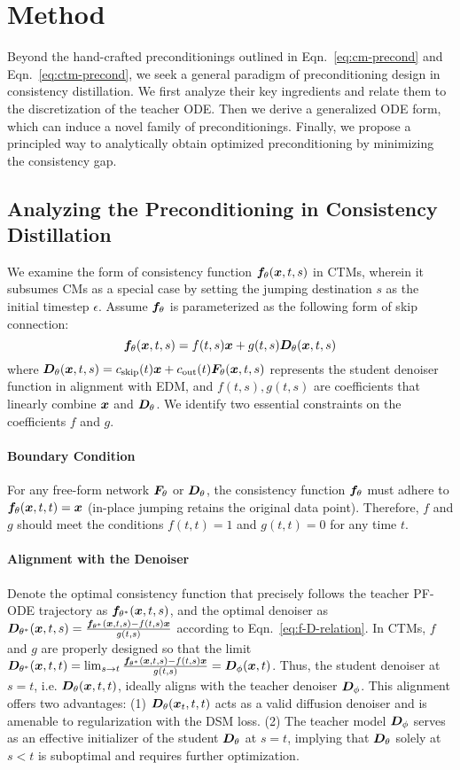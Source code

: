 \section{Method}
Beyond the hand-crafted preconditionings outlined in Eqn.~\eqref{eq:cm-precond} and Eqn.~\eqref{eq:ctm-precond}, we seek a general paradigm of preconditioning design in consistency distillation. We first analyze their key ingredients and relate them to the discretization of the teacher ODE. Then we derive a generalized ODE form, which can induce a novel family of preconditionings. Finally, we propose a principled way to analytically obtain optimized preconditioning by minimizing the consistency gap.
\subsection{Analyzing the Preconditioning in Consistency Distillation}
\label{sec:method-1}
We examine the form of consistency function $\bm{f}_\theta(\bm{x},t,s)$ in CTMs, wherein it subsumes CMs as a special case by setting the jumping destination $s$ as the initial timestep $\epsilon$. Assume $\bm{f}_\theta$ is parameterized as the following form of skip connection:
\begin{equation}
\label{eq:f-D-relation}
\bm{f}_\theta(\bm{x},t,s)=f(t,s)\bm{x}+g(t,s)\bm{D}_\theta(\bm{x},t,s)
\end{equation}
where $\bm{D}_\theta(\bm{x},t,s)=c_{\text{skip}}(t)\bm{x}+c_{\text{out}}(t)\bm{F}_\theta(\bm{x},t,s)$ represents the student denoiser function in alignment with EDM, and $f(t,s),g(t,s)$ are coefficients that linearly combine $\bm{x}$ and $\bm{D}_\theta$. We identify two essential constraints on the coefficients $f$ and $g$.
\paragraph{Boundary Condition} For any free-form network $\bm{F}_\theta$ or $\bm{D}_\theta$, the consistency function $\bm{f}_\theta$ must adhere to $\bm{f}_\theta(\bm{x},t,t)=\bm{x}$ (in-place jumping retains the original data point). Therefore, $f$ and $g$ should meet the conditions $f(t,t)=1$ and $g(t,t)=0$ for any time $t$.
\paragraph{Alignment with the Denoiser} Denote the optimal consistency function that precisely follows the teacher PF-ODE trajectory as $\bm{f}_{\theta^*}(\bm{x},t,s)$, and the optimal denoiser as $\bm{D}_{\theta^*}(\bm{x},t,s)=\frac{\bm{f}_{\theta^*}(\bm{x},t,s)-f(t,s)\bm{x}}{g(t,s)}$ according to Eqn.~\eqref{eq:f-D-relation}. In CTMs, $f$ and $g$ are properly designed so that the limit $\bm{D}_{\theta^*}(\bm{x},t,t)=\lim_{s\rightarrow t}\frac{\bm{f}_{\theta^*}(\bm{x},t,s)-f(t,s)\bm{x}}{g(t,s)}=\bm{D}_\phi(\bm{x},t)$. Thus, the student denoiser at $s=t$, i.e. $\bm{D}_\theta(\bm{x},t,t)$, ideally aligns with the teacher denoiser $\bm{D}_\phi$. This alignment offers two advantages: (1) $\bm{D}_{\theta}(\bm{x}_t,t,t)$ acts as a valid diffusion denoiser and is amenable to regularization with the DSM loss. (2) The teacher model $\bm{D}_\phi$ serves as an effective initializer of the student $\bm{D}_\theta$ at $s=t$, implying that $\bm{D}_\theta$ solely at $s<t$ is suboptimal and requires further optimization.

